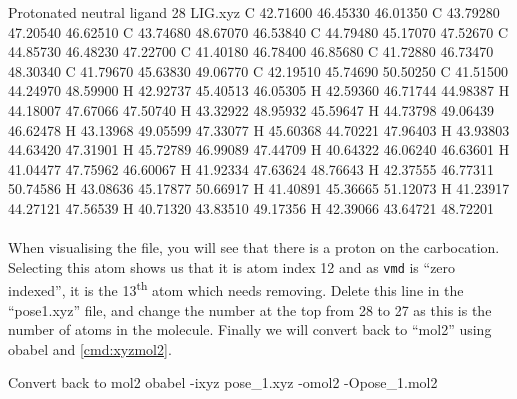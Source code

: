     \begin{bashoutput}[label=out:xyz]{Protonated neutral ligand}
28
LIG.xyz
C         42.71600       46.45330       46.01350
C         43.79280       47.20540       46.62510
C         43.74680       48.67070       46.53840
C         44.79480       45.17070       47.52670
C         44.85730       46.48230       47.22700
C         41.40180       46.78400       46.85680
C         41.72880       46.73470       48.30340
C         41.79670       45.63830       49.06770
C         42.19510       45.74690       50.50250
C         41.51500       44.24970       48.59900
H         42.92737       45.40513       46.05305
H         42.59360       46.71744       44.98387
H         44.18007       47.67066       47.50740
H         43.32922       48.95932       45.59647
H         44.73798       49.06439       46.62478
H         43.13968       49.05599       47.33077
H         45.60368       44.70221       47.96403
H         43.93803       44.63420       47.31901
H         45.72789       46.99089       47.44709
H         40.64322       46.06240       46.63601
H         41.04477       47.75962       46.60067
H         41.92334       47.63624       48.76643
H         42.37555       46.77311       50.74586
H         43.08636       45.17877       50.66917
H         41.40891       45.36665       51.12073
H         41.23917       44.27121       47.56539
H         40.71320       43.83510       49.17356
H         42.39066       43.64721       48.72201
    
    \end{bashoutput}

    \paragraph{}
        When visualising the file, you will see that there is a proton on the carbocation. Selecting this atom shows us that it is atom index 12 and as \texttt{vmd} is \enquote{zero indexed}, it is the 13\textsuperscript{th} atom which needs removing. Delete this line in the \enquote{pose\textunderscore 1.xyz} file, and change the number at the top from 28 to 27 as this is the number of atoms in the molecule. Finally we will convert back to \enquote{mol2} using obabel and \cref{cmd:xyzmol2}.

    \begin{bashcmd}[label=cmd:xyzmol2]{Convert back to mol2}
        obabel -ixyz pose_1.xyz -omol2 -Opose_1.mol2
    \end{bashcmd}


